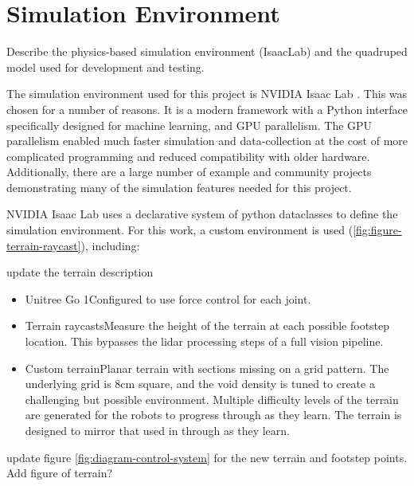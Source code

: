 \section{Simulation Environment}

\begin{outline}
  Describe the physics-based simulation environment (IsaacLab) and
  the quadruped model used for development and testing.
\end{outline}

The simulation environment used for this project is NVIDIA Isaac Lab
\cite{mittal_orbit_2023}. This was chosen for a number of reasons. It
is a modern framework with a Python interface specifically designed
for machine learning, and GPU parallelism. The GPU parallelism
enabled much faster simulation and data-collection at the cost of
more complicated programming and reduced compatibility with older
hardware. Additionally, there are a large number of example and
community projects demonstrating many of the simulation features
needed for this project.

NVIDIA Isaac Lab uses a declarative system of python dataclasses to
define the simulation environment. For this work, a custom
environment is used (\autoref{fig:figure-terrain-raycast}), including:

\begin{todo}
  update the terrain description
\end{todo}

\begin{itemize}
  \item Unitree Go 1\textemdash Configured to use force control for each joint.
  \item Terrain raycasts\textemdash Measure the height of the terrain
    at each possible footstep location. This bypasses the lidar
    processing steps of a full vision pipeline.
  \item Custom terrain\textemdash Planar terrain with sections
    missing on a grid pattern. The underlying grid is 8cm square, and
    the void density is tuned to create a challenging but possible
    environment. Multiple difficulty levels of the terrain are generated
    for the robots to progress through as they learn.
    The terrain is designed to mirror that used in
    \cite{bratta_contactnet_2024}
    through as they learn.
\end{itemize}

\begin{todo}
  update figure \autoref{fig:diagram-control-system} for the new
  terrain and footstep points.
  Add figure of terrain?
\end{todo}

